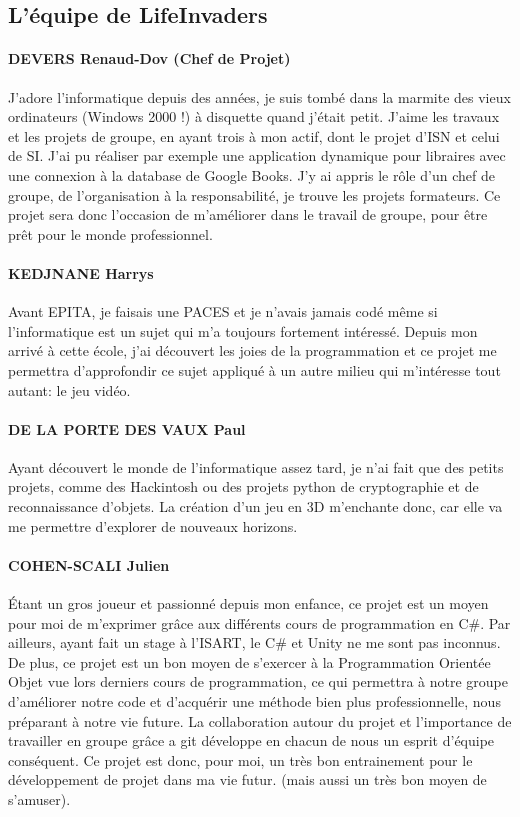 \subsection{L'équipe de LifeInvaders}

    \paragraph{DEVERS Renaud-Dov (Chef de Projet)}
    J'adore l'informatique depuis des années, je suis tombé dans la marmite des vieux ordinateurs (Windows 2000 !) à disquette quand j'était petit.
    J'aime les travaux et les projets de groupe, en ayant trois à mon actif, dont le projet d'ISN et celui de SI. J'ai pu réaliser par exemple une application dynamique pour libraires avec une connexion à la database de Google Books.
    J'y ai appris le rôle d'un chef de groupe, de l'organisation à la responsabilité, je trouve les projets formateurs.
    Ce projet sera donc l'occasion de m'améliorer dans le travail de groupe, pour être prêt pour le monde professionnel.


    \paragraph{KEDJNANE Harrys}
    Avant EPITA, je faisais une PACES et je n’avais jamais codé même si l’informatique est un sujet qui m’a toujours fortement intéressé. Depuis mon arrivé à cette école, j’ai découvert les joies de la programmation et ce projet me permettra d’approfondir ce sujet appliqué à un autre milieu qui m’intéresse tout autant: le jeu vidéo. 


    \paragraph{DE LA PORTE DES VAUX Paul}
    Ayant découvert le monde de l’informatique assez tard, je n’ai fait que des petits projets, comme des Hackintosh ou des projets python de cryptographie et de reconnaissance d’objets.
    La création d’un jeu en 3D m’enchante donc, car elle va me permettre d’explorer de nouveaux horizons.


    \paragraph{COHEN-SCALI Julien}
    Étant un gros joueur et passionné depuis mon enfance, ce projet est un moyen pour moi de m’exprimer grâce aux différents cours de programmation en C\#.
    Par ailleurs, ayant fait un stage à l’ISART, le C\# et Unity ne me sont pas inconnus. De plus, ce projet est un bon moyen de s’exercer à la Programmation Orientée Objet vue lors derniers cours de programmation,
    ce qui permettra à notre groupe d’améliorer notre code et d’acquérir une méthode bien plus professionnelle, nous préparant à notre vie future.
    La collaboration autour du projet et l’importance de travailler en groupe grâce a git développe en chacun de nous un esprit d’équipe conséquent.
    Ce projet est donc, pour moi, un très bon entrainement pour le développement de projet dans ma vie futur. (mais aussi un très bon moyen de s’amuser).
